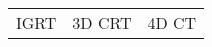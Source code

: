 \documentclass{article}
\begin{document}
\begin{table}[h!]
{\begin{tabular}{|cll|}
                                                                                                                                                                                                                                                                                                                                                                                                                                                              \\ \hline
    \multicolumn{1}{|c|}{IGRT}                                                                                                                                                                                                                                                                                                                                                                                                                                                                                                                                                                                                                                                                                                                                                                                                                                                                                                                                                                                                                              & \multicolumn{1}{c|}{3D CRT}                                                                                                                                                                                                                                                                                                                                                                                                                                                                                                                                                                                                                                                                                                                                                                                                                                                                                                                                                                                                                                                                                                                                                                                                                                                                                                                                                                                                                                                                                                              & \multicolumn{1}{c|}{4D CT}                                                                                                                                                                                                                                                   
\end{tabular}}
\end{table}
\end{document}

